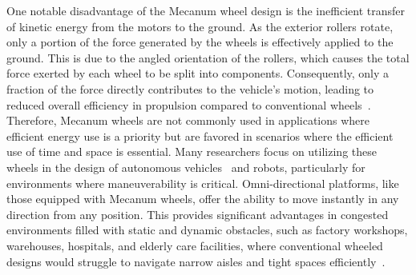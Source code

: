 One notable disadvantage of the Mecanum wheel design is the inefficient transfer of kinetic energy from the motors to the ground. As the exterior rollers rotate, only a portion of the force generated by the wheels is effectively applied to the ground. This is due to the angled orientation of the rollers, which causes the total force exerted by each wheel to be split into components. Consequently, only a fraction of the force directly contributes to the vehicle’s motion, leading to reduced overall efficiency in propulsion compared to conventional wheels~\cite{F.Adascalitei.2011}.\\
Therefore, Mecanum wheels are not commonly used in applications where efficient energy use is a priority but are favored in scenarios where the efficient use of time and space is essential. Many researchers focus on utilizing these wheels in the design of autonomous vehicles~\cite{Tlale.2008} and robots, particularly for environments where maneuverability is critical. Omni-directional platforms, like those equipped with Mecanum wheels, offer the ability to move instantly in any direction from any position. This provides significant advantages in congested environments filled with static and dynamic obstacles, such as factory workshops, warehouses, hospitals, and elderly care facilities, where conventional wheeled designs would struggle to navigate narrow aisles and tight spaces efficiently~\cite{nivenb.2002}.\\

